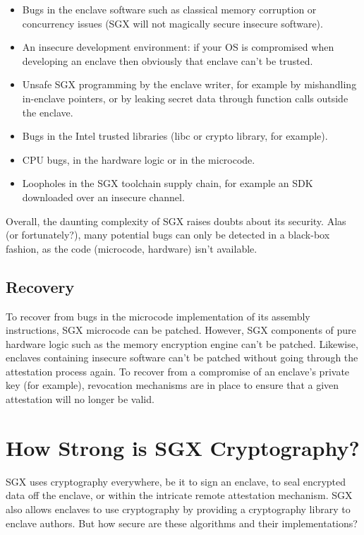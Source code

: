 \documentclass[]{article}
\begin{document}
\begin{itemize}
\item
  Bugs in the enclave software such as classical memory corruption or
  concurrency issues (SGX will not magically secure insecure software).
\item
  An insecure development environment: if your OS is compromised when
  developing an enclave then obviously that enclave can't be trusted.
\item
  Unsafe SGX programming by the enclave writer, for example by
  mishandling in-enclave pointers, or by leaking secret data through
  function calls outside the enclave.
\item
  Bugs in the Intel trusted libraries (libc or crypto library, for
  example).
\item
  CPU bugs, in the hardware logic or in the microcode.
\item
  Loopholes in the SGX toolchain supply chain, for example an SDK
  downloaded over an insecure channel.
\end{itemize}

Overall, the daunting complexity of SGX raises doubts about its
security. Alas (or fortunately?), many potential bugs can only be
detected in a black-box fashion, as the code (microcode, hardware) isn't
available.

\subsection{Recovery}\label{recovery}

To recover from bugs in the microcode implementation of its assembly
instructions, SGX microcode can be patched. However, SGX components of
pure hardware logic such as the memory encryption engine can't be
patched. Likewise, enclaves containing insecure software can't be
patched without going through the attestation process again. To recover
from a compromise of an enclave's private key (for example), revocation
mechanisms are in place to ensure that a given attestation will no
longer be valid.

\section{How Strong is SGX
Cryptography?}\label{how-strong-is-sgx-cryptography}

SGX uses cryptography everywhere, be it to sign an enclave, to seal
encrypted data off the enclave, or within the intricate remote
attestation mechanism. SGX also allows enclaves to use cryptography by
providing a cryptography library to enclave authors. But how secure are
these algorithms and their implementations?
\end{document}
